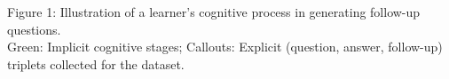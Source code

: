 \begin{strip}
  \vspace{-58pt}

    \noindent{}

  \begin{center}
    \fontsize{10pt}{12pt}\selectfont
   Figure 1: Illustration of a learner’s cognitive process in generating follow-up questions. \\ Green: Implicit cognitive stages; Callouts: Explicit (question, answer, follow-up) triplets collected for the dataset.
  \label{fig:teaser}
  \end{center}

\end{strip}

\setcounter{figure}{1}
